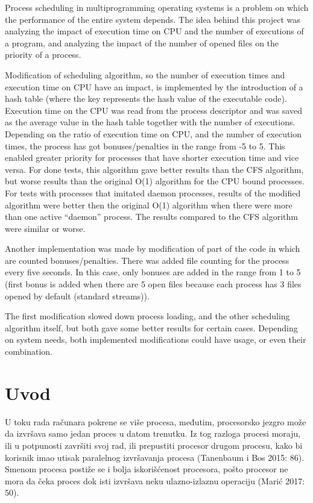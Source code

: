 \begin{AbstractEng}
Process scheduling in multiprogramming operating systems is a problem on which the performance of the entire system depends. The idea behind this project was analyzing the impact of execution time on CPU and the number of executions of a program, and analyzing the impact of the number of opened files on the priority of a process.

Modification of scheduling algorithm, so the number of execution times and execution time on CPU have an impact, is implemented by the introduction of a hash table (where the key represents the hash value of the executable code). Execution time on the CPU was read from the process descriptor and was saved as the average value in the hash table together with the number of executions. Depending on the ratio of execution time on CPU, and the number of execution times, the process has got bonuses/penalties in the range from -5 to 5. This enabled greater priority for processes that have shorter execution time and vice versa. For done tests, this algorithm gave better results than the CFS algorithm, but worse results than the original O(1) algorithm for the CPU bound processes. For tests with processes that imitated daemon processes, results of the modified algorithm were better then the original O(1) algorithm when there were more than one active “daemon” process. The results compared to the CFS algorithm were similar or worse.

Another implementation was made by modification of part of the code in which are counted bonuses/penalties. There was added file counting for the process every five seconds. In this case, only bonuses are added in the range from 1 to 5 (first bonus is added when there are 5 open files because each process has 3 files opened by default (standard streams)).

The first modification slowed down process loading, and the other scheduling algorithm itself, but both gave some better results for certain cases. Depending on system needs, both implemented modifications could have usage, or even their combination.
\end{AbstractEng}

\StartDoublePaper
\label{rac.diana}

\section{Uvod}

U toku rada računara pokrene se više procesa, međutim, procesorsko jezgro može da izvršava samo jedan proces u datom trenutku. Iz tog razloga procesi moraju, ili u potpunosti završiti svoj rad, ili prepustiti procesor drugom procesu, kako bi korisnik imao utisak paralelnog izvršavanja procesa (Tanenbaum i Bos 2015: 86). Smenom procesa postiže se i bolja iskorišćenost procesora, pošto procesor ne mora da čeka proces dok isti izvršava neku ulazno-izlaznu operaciju (Marić 2017: 50).

